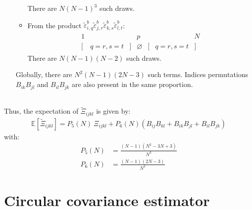 \documentclass[12pt]{scrartcl}
\begin{document}
\begin{enumerate}
\begin{itemize}
\begin{align}
\begin{array}{ccccccc}
\end{array}
\end{align}
There are $N(N-1)^3$ such draws.
\item From the product $\widetilde{\varepsilon}^b_{i,q} \widetilde{\varepsilon}^b_{j,r} \widetilde{\varepsilon}^b_{k,s} \widetilde{\varepsilon}^b_{l,t}$:
\begin{align}
\begin{array}{ccccccc}
1 & & & p & & & N \\
\big[ & q=r,s=t & \big] & \varnothing & \big[ & q=r,s=t & \big] \nonumber
\end{array}
\end{align}
There are $N(N-1)(N-2)$ such draws.
\end{itemize}
Globally, there are $N^2(N-1)(2N-3)$ such terms. Indices permutations $B_{ik}B_{jl}$ and $B_{il}B_{jk}$ are also present in the same proportion.
\end{enumerate}
$  $\\
Thus, the expectation of $\widetilde{\Xi}_{ijkl}$ is given by:
\begin{align}
\label{eq:exp_mom_4}
\mathbb{E} \left[\widetilde{\Xi}_{ijkl}\right] = P_5(N) \ \Xi_{ijkl} + P_6(N) \left(B_{ij}B_{kl} + B_{ik}B_{jl} + B_{il}B_{jk} \right)
\end{align}
with:
\begin{subequations}
\begin{align}
P_5(N) & = \frac{(N-1)(N^2-3N+3)}{N^3} \\
P_6(N) & = \frac{(N-1)(2N-3)}{N^3}
\end{align}
\end{subequations}

\section{Circular covariance estimator}
\end{document}
